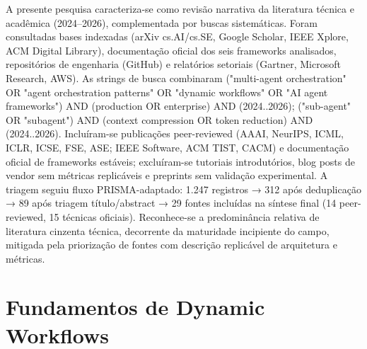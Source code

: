 \documentclass[12pt,a4paper]{article}
\begin{document}
A presente pesquisa caracteriza-se como revisão narrativa da literatura técnica e acadêmica (2024–2026), complementada por buscas sistemáticas. Foram consultadas bases indexadas (arXiv cs.AI/cs.SE, Google Scholar, IEEE Xplore, ACM Digital Library), documentação oficial dos seis frameworks analisados, repositórios de engenharia (GitHub) e relatórios setoriais (Gartner, Microsoft Research, AWS). As strings de busca combinaram ("multi-agent orchestration" OR "agent orchestration patterns" OR "dynamic workflows" OR "AI agent frameworks") AND (production OR enterprise) AND (2024..2026); ("sub-agent" OR "subagent") AND (context compression OR token reduction) AND (2024..2026). Incluíram-se publicações peer-reviewed (AAAI, NeurIPS, ICML, ICLR, ICSE, FSE, ASE; IEEE Software, ACM TIST, CACM) e documentação oficial de frameworks estáveis; excluíram-se tutoriais introdutórios, blog posts de vendor sem métricas replicáveis e preprints sem validação experimental. A triagem seguiu fluxo PRISMA-adaptado: 1.247 registros → 312 após deduplicação → 89 após triagem título/abstract → 29 fontes incluídas na síntese final (14 peer-reviewed, 15 técnicas oficiais). Reconhece-se a predominância relativa de literatura cinzenta técnica, decorrente da maturidade incipiente do campo, mitigada pela priorização de fontes com descrição replicável de arquitetura e métricas.


\section{Fundamentos de Dynamic Workflows}
\end{document}
